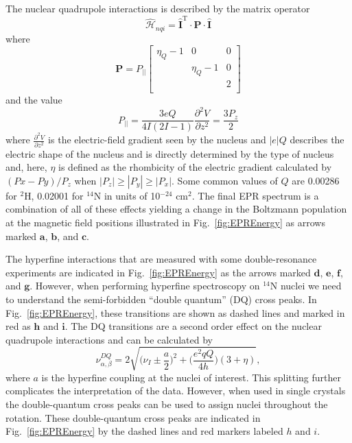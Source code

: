 The nuclear quadrupole interactions is described by the matrix operator
\begin{equation}
    \hat{\mathcal{H}}_{nqi} = \mathbf{\hat{I}}^\text{T} \cdot \mathbf{P} \cdot \mathbf{\hat{I}} \label{eq-2:nqi}
\end{equation}
where
\begin{equation}
    \mathbf{P} = P_{||}   \begin{bmatrix}
   \eta_Q -1 & 0 & 0\\
     & \eta_Q -1 & 0\\
    &   & 2\\
   \end{bmatrix}
\end{equation}
and the value 
\begin{equation}
    P_{||} = \frac{3 e Q}{4I(2I-1)}\frac{\partial^2 V}{\partial z^2} = \frac{3 P_z}{2}
\end{equation}
where $\frac{\partial^2 V}{\partial z^2}$ is the electric-field gradient seen by the nucleus and $|e|Q$ describes the electric shape of the nucleus and is directly determined by the type of nucleus and, here, $\eta$ is defined as the rhombicity of the electric gradient calculated by $(Px-Py)/P_z$ when $|P_z|\geq |P_y|\geq |P_x|$. \cite{abragam2012electron,weil2007electron} Some common values of $Q$ are 0.00286 for $^2$H, 0.02001 for $^{14}$N in units of 10$^{-24}$ cm$^2$. The final EPR spectrum is a combination of all of these effects yielding a change in the Boltzmann population at the magnetic field positions illustrated in Fig.~\ref{fig:EPREnergy} as arrows marked $\mathbf{a}$, $\mathbf{b}$, and $\mathbf{c}$.

The hyperfine interactions that are measured with some double-resonance experiments are indicated in Fig.~\ref{fig:EPREnergy} as the arrows marked $\mathbf{d}$, $\mathbf{e}$, $\mathbf{f}$, and $\mathbf{g}$. However, when performing hyperfine spectroscopy on $^{14}$N nuclei we need to understand the semi-forbidden ``double quantum'' (DQ) cross peaks. In Fig.~\ref{fig:EPREnergy}, these transitions are shown as dashed lines and marked in red as $\mathbf{h}$ and $\mathbf{i}$. The DQ transitions are a second order effect on the nuclear quadrupole interactions and can be calculated by
\begin{equation}
\nu^{DQ}_{\alpha, \beta} = 2 \sqrt{\bigg(\nu_I \pm \frac{a}{2}\bigg)^2+\bigg(\frac{e^2 q Q}{4 h}\bigg)(3+\eta)}, \label{eq-2:doubleQ}
\end{equation}
where $a$ is the hyperfine coupling at the nuclei of interest. \cite{Doorslaer2007} This splitting further complicates the interpretation of the data. However, when used in single crystals the double-quantum cross peaks can be used to assign nuclei throughout the rotation. These double-quantum cross peaks are indicated in Fig.~\ref{fig:EPREnergy} by the dashed lines and red markers labeled $h$ and $i$.

